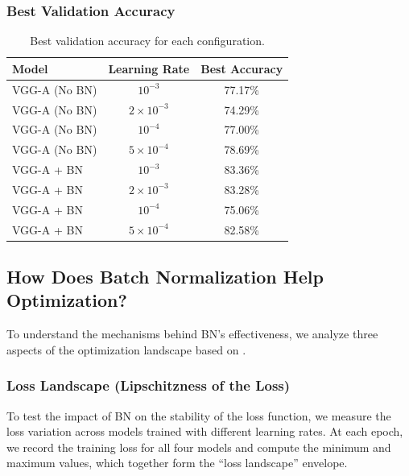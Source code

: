 \documentclass[11pt,a4paper]{article}
\begin{document}
\subsubsection{Best Validation Accuracy}

\begin{table}[H]
\centering
\caption{Best validation accuracy for each configuration.}
\begin{tabular}{lcc}
\toprule
\textbf{Model} & \textbf{Learning Rate} & \textbf{Best Accuracy} \\
\midrule
VGG-A (No BN)  & $10^{-3}$           & 77.17\% \\
VGG-A (No BN)  & $2\times10^{-3}$    & 74.29\% \\
VGG-A (No BN)  & $10^{-4}$           & 77.00\% \\
VGG-A (No BN)  & $5\times10^{-4}$    & 78.69\% \\
\midrule
VGG-A + BN     & $10^{-3}$           & 83.36\% \\
VGG-A + BN     & $2\times10^{-3}$    & 83.28\% \\
VGG-A + BN     & $10^{-4}$           & 75.06\% \\
VGG-A + BN     & $5\times10^{-4}$    & 82.58\% \\
\bottomrule
\end{tabular}
\end{table}

\subsection{How Does Batch Normalization Help Optimization?}

To understand the mechanisms behind BN's effectiveness, we analyze three aspects of the optimization landscape based on \cite{bn_neurips2018}.

\subsubsection{Loss Landscape (Lipschitzness of the Loss)}

To test the impact of BN on the stability of the loss function, we measure the loss variation across models trained with different learning rates. At each epoch, we record the training loss for all four models and compute the minimum and maximum values, which together form the ``loss landscape'' envelope.
\end{document}
